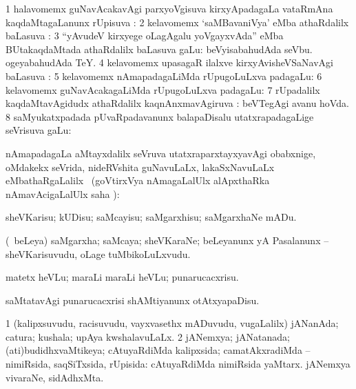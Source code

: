 \bentry
{}
\gl{\uparx}
\bmng
\bnum
\num{1} halavomemx guNavAcakavAgi parxyoVgisuva kirxyApadagaLa vataRmAna kaqdaMtagaLanunx rUpisuva \uparx:  
\num{2} kelavomemx `saMBavaniVya' eMba athaRdalilx baLasuva \uparx:  
\num{3} ``yAvudeV kirxyege oLagAgalu yoVgayxvAda'' eMba BUtakaqdaMtada athaRdalilx baLasuva \vakaq gaLu:  beVyisabahudAda seVbu.  ogeyabahudAda TeY. 
\num{4} kelavomemx upasagaR ilalxve kirxyAvisheVSaNavAgi baLasuva \uparx:  
\num{5} kelavomemx nAmapadagaLiMda rUpugoLuLxva padagaLu:  
\num{6} kelavomemx guNavAcakagaLiMda rUpugoLuLxva padagaLu:  
\num{7} rUpadalilx kaqdaMtavAgidudx athaRdalilx kaqnAnxmavAgiruva \vakaq:  beVTegAgi avanu hoVda. 
\num{8} saMyukatxpadada pUvaRpadavanunx balapaDisalu utatxrapadagaLige seVrisuva \vakaq gaLu:  
\enum
\emng
\eentry

\bentry
{}
\gl{\uparx}
\bmng
nAmapadagaLa aMtayxdalilx seVruva utatxraparxtayxyavAgi obabxnige, oMdakekx seVrida, nideRVshita guNavuLaLx, lakaSxNavuLaLx eMbathaRgaLalilx \parx\ (goVtirxVya nAmagaLalUlx alApxthaRka nAmavAcigaLalUlx saha \parx):  
\emng
\eentry

\bentry
{}
\gl{\sakirx}
\bmng
sheVKarisu; kUDisu; saMcayisu; saMgarxhisu; saMgarxhaNe mADu. 
\emng
\eentry

\bentry
{}
\gl{\nA}
\bmng
(\kanmu\ beLeya) saMgarxha; saMcaya; sheVKaraNe; beLeyanunx yA Pasalanunx -- sheVKarisuvudu, oLage tuMbikoLuLxvudu. 
\emng
\eentry

\bentry
{}
\gl{\sakirx}
\bmng
matetx heVLu; maraLi maraLi heVLu; punarucacxrisu. 
\emng

\noindent
\gl{\pagu}
\bmng
{} saMtatavAgi punarucacxrisi shAMtiyanunx otAtxyapaDisu. 
\emng
\eentry

\bentry
{}
\gl{\gu}
\bmng
\bnum
\num{1} (kalipxsuvudu, racisuvudu, vayxvasethx mADuvudu, \mo vugaLalilx) jANanAda; catura; kushala; upAya kwshalavuLaLx. 
\num{2} jANemxya; jANatanada; (ati)budidhxvaMtikeya; cAtuyaRdiMda kalipxsida; camatAkxradiMda -- nimiRsida, saqSiTxsida, rUpisida:  cAtuyaRdiMda nimiRsida yaMtarx.  jANemxya vivaraNe, sidAdhxMta. 
\enum
\emng
\eentry

